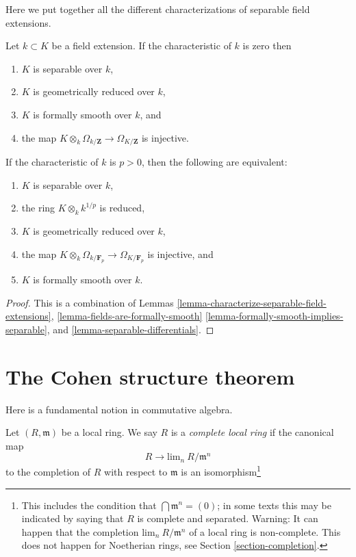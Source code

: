 \noindent
Here we put together all the different characterizations of separable
field extensions.

\begin{proposition}
\label{proposition-characterize-separable-field-extensions}
Let $k \subset K$ be a field extension.
If the characteristic of $k$ is zero then
\begin{enumerate}
\item $K$ is separable over $k$,
\item $K$ is geometrically reduced over $k$,
\item $K$ is formally smooth over $k$, and
\item the map $K \otimes_k \Omega_{k/\mathbf{Z}} \to \Omega_{K/\mathbf{Z}}$
is injective.
\end{enumerate}
If the characteristic of $k$ is $p > 0$, then the following are
equivalent:
\begin{enumerate}
\item $K$ is separable over $k$,
\item the ring $K \otimes_k k^{1/p}$ is reduced,
\item $K$ is geometrically reduced over $k$,
\item the map $K \otimes_k \Omega_{k/\mathbf{F}_p} \to \Omega_{K/\mathbf{F}_p}$
is injective, and
\item $K$ is formally smooth over $k$.
\end{enumerate}
\end{proposition}

\begin{proof}
This is a combination of
Lemmas \ref{lemma-characterize-separable-field-extensions},
\ref{lemma-fields-are-formally-smooth}
\ref{lemma-formally-smooth-implies-separable}, and
\ref{lemma-separable-differentials}.
\end{proof}











\section{The Cohen structure theorem}
\label{section-cohen-structure-theorem}

\noindent
Here is a fundamental notion in commutative algebra.

\begin{definition}
\label{definition-complete-local-ring}
Let $(R, \mathfrak m)$ be a local ring. We say $R$ is a
{\it complete local ring} if the canonical map
$$
R \longrightarrow \text{lim}_n\ R/\mathfrak m^n
$$
to the completion of $R$ with respect to $\mathfrak m$ is an
isomorphism\footnote{This includes the condition
that $\bigcap \mathfrak m^n = (0)$; in some texts this may be indicated
by saying that $R$ is complete and separated. Warning: It can happen
that the completion $\text{lim}_n\ R/\mathfrak m^n$ of a local ring is
non-complete. This does not happen for Noetherian rings, see
Section \ref{section-completion}.}
\end{definition}

